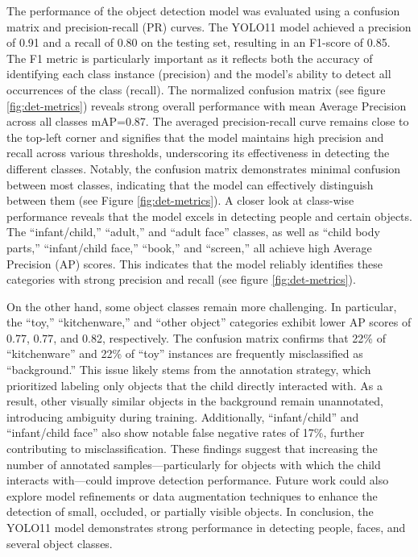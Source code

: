 \documentclass[
  man,floatsintext]{apa6}
\begin{document}
The performance of the object detection model was evaluated using a confusion matrix and precision-recall (PR) curves. The YOLO11 model achieved a precision of 0.91 and a recall of 0.80 on the testing set, resulting in an F1-score of 0.85. The F1 metric is particularly important as it reflects both the accuracy of identifying each class instance (precision) and the model's ability to detect all occurrences of the class (recall). The normalized confusion matrix (see figure \ref{fig:det-metrics}) reveals strong overall performance with mean Average Precision across all classes mAP=0.87. The averaged precision-recall curve remains close to the top-left corner and signifies that the model maintains high precision and recall across various thresholds, underscoring its effectiveness in detecting the different classes. Notably, the confusion matrix demonstrates minimal confusion between most classes, indicating that the model can effectively distinguish between them (see Figure \ref{fig:det-metrics}). A closer look at class-wise performance reveals that the model excels in detecting people and certain objects. The ``infant/child,'' ``adult,'' and ``adult face'' classes, as well as ``child body parts,'' ``infant/child face,'' ``book,'' and ``screen,'' all achieve high Average Precision (AP) scores. This indicates that the model reliably identifies these categories with strong precision and recall (see figure \ref{fig:det-metrics}).

On the other hand, some object classes remain more challenging. In particular, the ``toy,'' ``kitchenware,'' and ``other object'' categories exhibit lower AP scores of 0.77, 0.77, and 0.82, respectively. The confusion matrix confirms that 22\% of ``kitchenware'' and 22\% of ``toy'' instances are frequently misclassified as ``background.'' This issue likely stems from the annotation strategy, which prioritized labeling only objects that the child directly interacted with. As a result, other visually similar objects in the background remain unannotated, introducing ambiguity during training. Additionally, ``infant/child'' and ``infant/child face'' also show notable false negative rates of 17\%, further contributing to misclassification. These findings suggest that increasing the number of annotated samples---particularly for objects with which the child interacts with---could improve detection performance. Future work could also explore model refinements or data augmentation techniques to enhance the detection of small, occluded, or partially visible objects. In conclusion, the YOLO11 model demonstrates strong performance in detecting people, faces, and several object classes.
\end{document}
